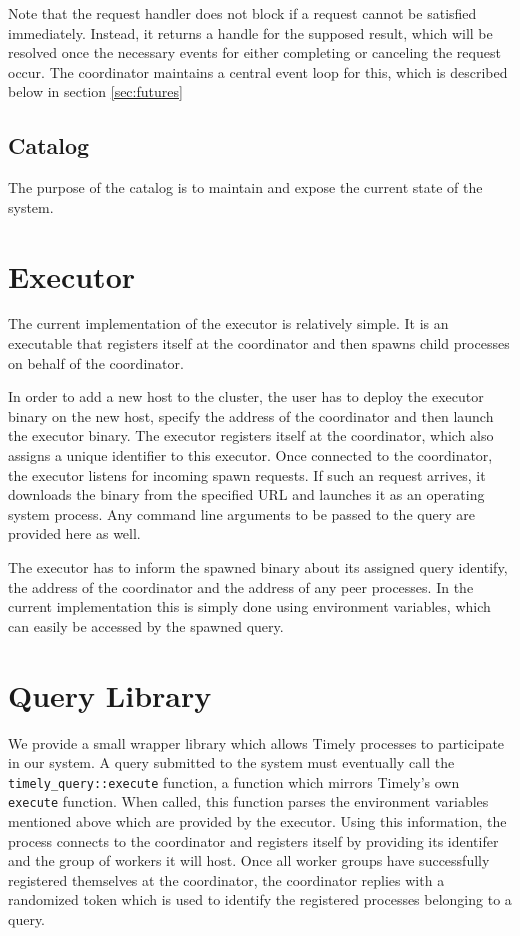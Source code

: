 Note that the request handler does not block if a request cannot be satisfied
immediately. Instead, it returns a handle for the supposed result, which will
be resolved once the necessary events for either completing or canceling the
request occur. The coordinator maintains a central event loop for this, which
is described below in section \ref{sec:futures}

\subsection{Catalog}

The purpose of the catalog is to maintain and expose the current state of the
system. 

\section{Executor}

The current implementation of the executor is relatively simple. It is an executable
that registers itself at the coordinator and then spawns child processes on behalf
of the coordinator.

In order to add a new host to the cluster, the user has to deploy the executor
binary on the new host, specify the address of the coordinator and then launch
the executor binary. The executor registers itself at the coordinator, which
also assigns a unique identifier to this executor. Once connected to the
coordinator, the executor listens for incoming spawn requests. If such an
request arrives, it downloads the binary from the specified URL and launches
it as an operating system process. Any command line arguments to be passed
to the query are provided here as well.

The executor has to inform the spawned binary about its assigned query identify,
the address of the coordinator and the address of any peer processes. In the
current implementation this is simply done using environment variables, which
can easily be accessed by the spawned query.


\section{Query Library}

We provide a small wrapper library which allows Timely processes to participate
in our system. A query submitted to the system must eventually call the 
\lstinline{timely_query::execute} function, a function which mirrors Timely's
own \lstinline{execute} function. When called, this function parses the
environment variables mentioned above which are provided by the executor.
Using this information, the process connects to the coordinator and registers
itself by providing its identifer and the group of workers it will host. Once
all worker groups have successfully registered themselves at the coordinator,
the coordinator replies with a randomized token which is used to identify
the registered processes belonging to a query. 

